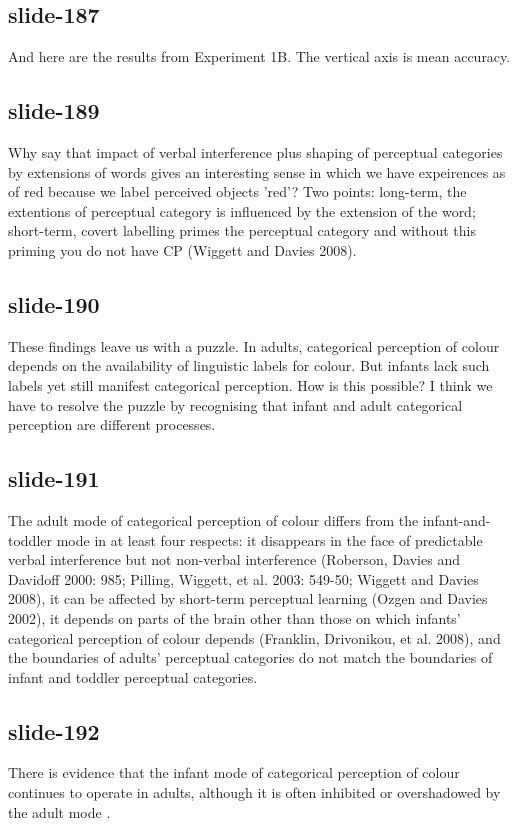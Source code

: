 \documentclass[12pt,\papersize]{extarticle}
\begin{document}
 
\subsection{slide-187}
And here are the results from Experiment 1B. The vertical axis is mean accuracy.
 
 
\subsection{slide-189}
Why say that impact of verbal interference plus shaping of perceptual categories by extensions of words gives an interesting sense in which we have expeirences as of red because we label perceived objects 'red'? Two points: long-term, the extentions of perceptual category is influenced by the extension of the word; short-term, covert labelling primes the perceptual category and without this priming you do not have CP (Wiggett and Davies 2008).
 
 
\subsection{slide-190}
These findings leave us with a puzzle.
In adults, categorical perception of colour depends on the availability of linguistic labels for colour.
But infants lack such labels yet still manifest categorical perception.
How is this possible?
I think we have to resolve the puzzle by recognising that infant and adult categorical perception are different processes.
 
 
\subsection{slide-191}
The adult mode of categorical perception of colour differs from the infant-and-toddler mode in at least four respects: it disappears in the face of predictable verbal interference but not non-verbal interference (Roberson, Davies and Davidoff 2000: 985; Pilling, Wiggett, et al. 2003: 549-50; Wiggett and Davies 2008), it can be affected by short-term perceptual learning (Ozgen and Davies 2002), it depends on parts of the brain other than those on which infants' categorical perception of colour depends (Franklin, Drivonikou, et al. 2008), and the boundaries of adults' perceptual categories do not match the boundaries of infant and toddler perceptual categories.
 
 
\subsection{slide-192}
There is evidence that the infant mode of categorical perception of colour continues to operate in adults, although it is often inhibited or overshadowed by the adult mode \citep{Gilbert:2006yb}.
 
\end{document}
